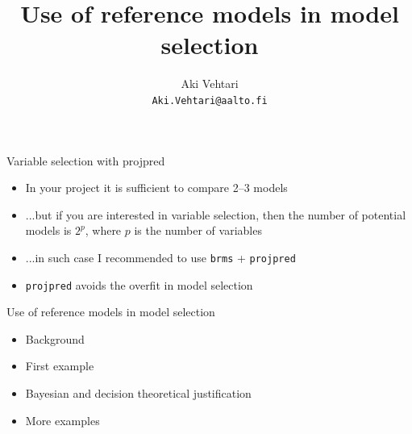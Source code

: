 \documentclass[t]{beamer}
\title[]{\LARGE{Use of reference models in model selection}}
\author[Aki.Vehtari@aalto.fi -- @avehtari]{Aki Vehtari \\ 
  \small{\texttt{Aki.Vehtari@aalto.fi}}}  %
\institute[Department of Computer Science\\
Aalto University] %
{Department of Computer Science\\
Aalto University}
\date[]{}
\begin{document}

  


    


\begin{frame}{Variable selection with projpred}

  \begin{itemize}
  \item<+-> In your project it is sufficient to compare 2--3 models
  \item<+-> ...but if you are interested in variable selection, then the
    number of potential models is $2^p$, where $p$ is the number of
    variables
  \item<+-> ...in such case I recommended to use \texttt{brms} + \texttt{projpred}
  \item<+-> \texttt{projpred} avoids the overfit in model selection
  \end{itemize}
  
\end{frame}


\begin{frame}{Use of reference models in model selection}

  \begin{itemize}
  \item Background
  \item First example
  \item Bayesian and decision theoretical justification
  \item More examples
  \end{itemize}
  
\end{frame}
\end{document}
